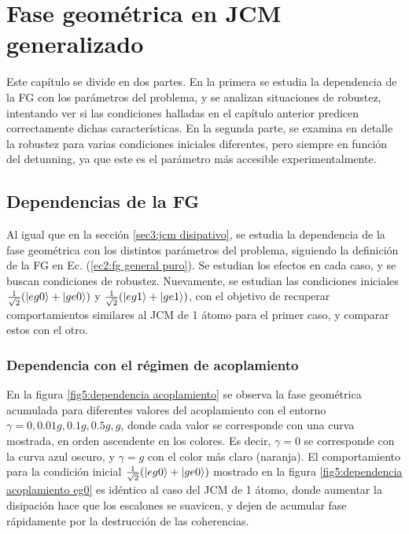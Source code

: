 \chapter{Fase geométrica en JCM generalizado}
\label{ch5:fgdoble}


\pagestyle{fancy}
\fancyhf{}
\fancyhead[LE]{\nouppercase{\rightmark\hfill}}
\fancyhead[RO]{\nouppercase{\leftmark\hfill}}
\fancyfoot[LE,RO]{\hfill\thepage\hfill}
Este capítulo se divide en dos partes. En la primera se estudia la dependencia de la FG con los parámetros del problema, y se analizan situaciones de robustez, intentando ver si las condiciones halladas en el capítulo anterior predicen correctamente dichas características. En la segunda parte, se examina en detalle la robustez para varias condiciones iniciales diferentes, pero siempre en función del detunning, ya que este es el parámetro más accesible experimentalmente.

\section{Dependencias de la FG}

Al igual que en la sección \ref{sec3:jcm disipativo}, se estudia la dependencia de la fase geométrica con los distintos parámetros del problema, siguiendo la definición de la FG en Ec. (\ref{ec2:fg general puro}). Se estudian los efectos en cada caso, y se buscan condiciones de robustez. Nuevamente, se estudian las condiciones iniciales $\frac{1}{\sqrt{2}}(\ket{eg0}+\ket{ge0})$ y $\frac{1}{\sqrt{2}}(\ket{eg1}+\ket{ge1})$, con el objetivo de recuperar comportamientos similares al JCM de 1 átomo para el primer caso, y comparar estos con el otro. 

\subsection{Dependencia con el régimen de acoplamiento}

En la figura \ref{fig5:dependencia acoplamiento} se observa la fase geométrica acumulada para diferentes valores del acoplamiento con el entorno $\gamma=0, 0.01g,0.1g,0.5g,g$, donde cada valor se corresponde con una curva mostrada, en orden ascendente en los colores. Es decir, $\gamma=0$ se corresponde con la curva azul oscuro, y $\gamma=g$ con el color más claro (naranja). El comportamiento para la condición inicial $\frac{1}{\sqrt{2}}(\ket{eg0}+\ket{ge0})$ mostrado en la figura \ref{fig5:dependencia acoplamiento eg0} es idéntico al caso del JCM de 1 átomo, donde aumentar la disipación hace que los escalones se suavicen, y dejen de acumular fase rápidamente por la destrucción de las coherencias. 

